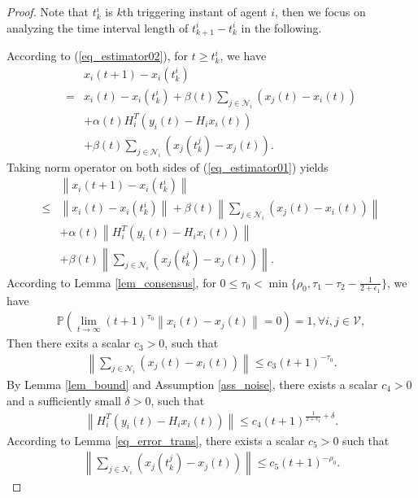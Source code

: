 \documentclass[10pt,journal,final]{IEEEtran}
\newcommand{\norm}[1]{\left\lVert#1\right\rVert}
\theoremstyle{plain}
\theoremstyle{definition}
\theoremstyle{remark}
\begin{document}
	\begin{proof}
Note that $t_{k}^i$ is $k$th triggering instant of agent $i$, then we focus on analyzing the 
time interval length of $t_{k+1}^i-t_{k}^i$ in the following.

According to (\ref{eq_estimator02}), for $t\geq t_{k}^i$, we have 
\begin{align}\label{eq_estimator01}
&x_{i}(t+1)-x_{i}(t_{k}^i)\\
=&x_{i}(t)-x_{i}(t_{k}^i)+\beta(t)\sum_{j\in\mathcal{N}_{i}}(x_{j}(t)-x_{i}(t))\nonumber\\
&+\alpha(t)  H_{i}^T( y_{i}(t)-H_{i}x_{i}(t))\nonumber\\
&+\beta(t)\sum_{j\in\mathcal{N}_{i}}(x_{j}(t_{k}^j)-x_{j}(t))\nonumber.
\end{align}
Taking norm operator on both sides of (\ref{eq_estimator01}) yields
\begin{align}\label{eq_estimator012}
&\norm{x_{i}(t+1)-x_{i}(t_{k}^i)}\\
\leq&\norm{x_{i}(t)-x_{i}(t_{k}^i)}+\beta(t)\norm{\sum_{j\in\mathcal{N}_{i}}(x_{j}(t)-x_{i}(t))}\nonumber\\
&+\alpha(t) \norm{ H_{i}^T( y_{i}(t)-H_{i}x_{i}(t))}\nonumber\\
&+\beta(t)\norm{\sum_{j\in\mathcal{N}_{i}}(x_{j}(t_{k}^j)-x_{j}(t))}\nonumber.
\end{align}
According to Lemma \ref{lem_consensus}, for $	0\leq\tau_0<\min\{\rho_0,\tau_1-\tau_2-\frac{1}{2+\epsilon_1}\}$, we have
	\begin{align*}
\mathbb{P}\left(\lim\limits_{t\rightarrow\infty}(t+1)^{\tau_0}\norm{x_i(t)-x_{j}(t)}=0\right)=1, \forall i,j\in\mathcal{V},
\end{align*}
Then there exits a scalar $c_3>0$, such that
\begin{align}\label{eq_c3}
\norm{\sum_{j\in\mathcal{N}_{i}}(x_{j}(t)-x_{i}(t))}\leq c_3 (t+1)^{-\tau_0}. 
\end{align}
By Lemma \ref{lem_bound} and Assumption \ref{ass_noise},  there exists a scalar $c_4>0$ and a sufficiently small $\delta>0$, such that
\begin{align}\label{eq_c4}
\norm{ H_{i}^T( y_{i}(t)-H_{i}x_{i}(t))}\leq c_4(t+1)^{\frac{1}{2+\epsilon_1}+\delta}.
\end{align}
According to Lemma \ref{eq_error_trans}, there exists a scalar $c_5>0$ such that 
\begin{align}\label{eq_c5}
\norm{\sum_{j\in\mathcal{N}_{i}}(x_{j}(t_{k}^j)-x_{j}(t))}\leq c_5(t+1)^{-\rho_0}.
\end{align}

\end{proof}
\end{document}
